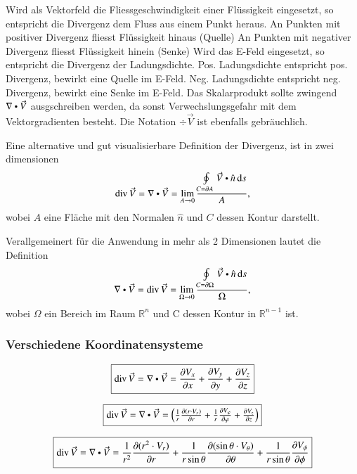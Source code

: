 \medskip
\begin{outline}
    \1 Wird als Vektorfeld die Fliessgeschwindigkeit einer Flüssigkeit eingesetzt, so entspricht die Divergenz dem Fluss aus einem Punkt heraus.
        \2 An Punkten mit positiver Divergenz fliesst Flüssigkeit hinaus (Quelle)
        \2 An Punkten mit negativer Divergenz fliesst Flüssigkeit hinein (Senke)
    \1 Wird das E-Feld eingesetzt, so entspricht die Divergenz der Ladungsdichte.
        \2 Pos. Ladungsdichte entspricht pos. Divergenz, bewirkt eine Quelle im E-Feld.
        \2 Neg. Ladungsdichte entspricht neg. Divergenz, bewirkt eine Senke im E-Feld.
    \1 Das Skalarprodukt sollte zwingend $\nabla \dotp \vec{V}$ ausgschreiben werden, da sonst Verwechslungsgefahr mit dem Vektorgradienten besteht.
    \1 Die Notation $ \div \vec{V}$ ist ebenfalls gebräuchlich.
\end{outline}

\medskip
Eine alternative und gut visualisierbare Definition der Divergenz, ist in zwei dimensionen
\[
    \div \vec{V} = \nabla\dotp\vec{V}  = \lim_{A \to 0}\frac{\oint\limits_{C = \partial A} \vec{V} \dotp \hat{n} \diff s}{A},
\]
wobei $A$ eine Fläche mit den Normalen $\hat{n}$ und $C$ dessen Kontur darstellt.

Verallgemeinert für die Anwendung in mehr als 2 Dimensionen lautet die Definition
\[
    \nabla\dotp\vec{V} = \div \vec{V} = \lim_{\Omega \to 0}\frac{\oint\limits_{C = \partial \Omega}\vec{V} \dotp \hat{n} \diff s}{\Omega},
\]
wobei $\Omega$ ein Bereich im Raum $\mathbb{R}^n$ und C dessen Kontur in $\mathbb{R}^{n-1}$ ist.

\subsubsection{Verschiedene Koordinatensysteme}
\[
    \boxed{
        \div \vec{V}
        = \nabla \dotp \vec{V}
        = \frac{\partial V_x}{\partial x} + \frac{\partial V_y}{\partial y} + \frac{\partial V_z}{\partial z}
    }
\]

\[
    \boxed{
        \div \vec{V}
        = \nabla \dotp \vec{V}
        = \begin{pmatrix}
            \frac{1}{r} \frac{\partial (r \cdot V_r)}{\partial r} + \frac{1}{r} \frac{\partial V_\varphi}{\partial \varphi} + \frac{\partial V_z}{\partial z}\\
        \end{pmatrix}
    }
\]

\[
    \boxed{
        \div \vec{V}
        = \nabla \dotp \vec{V}
        = \frac{1}{r^2} \frac{\partial (r^2 \cdot V_r)}{\partial r} + \frac{1}{r \sin \theta} \frac{\partial (\sin \theta \cdot V_\theta)}{\partial \theta} + \frac{1}{r \sin \theta} \frac{\partial V_\phi}{\partial \phi}
    }
\]


